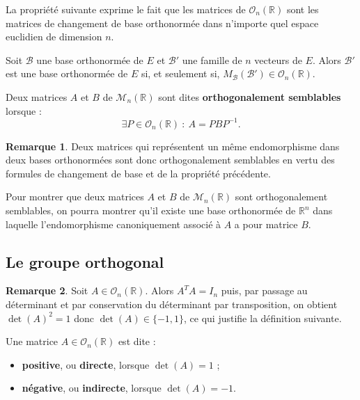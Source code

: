 \documentclass[french]{article}
\newcommand{\R}{\mathbb{R}}
\newcommand{\inv}{^{-1}}
\theoremstyle{plain}
\theoremstyle{definition}
\newtheorem*{rmq}{Remarque}
\theoremstyle{remark}
\begin{document}
La propriété suivante exprime le fait que les matrices de $\mathcal{O}_n(\R)$ sont les matrices de changement de base orthonormée dans n'importe quel espace euclidien de dimension $n$.

\begin{prop}
	Soit $\mathcal{B}$ une base orthonormée de $E$ et $\mathcal{B}'$ une famille de $n$ vecteurs de $E$. Alors $\mathcal{B}'$ est une base orthonormée de $E$ si, et seulement si, $M_\mathcal{B}(\mathcal{B}')\in\mathcal{O}_n(\R)$.
\end{prop}

\begin{dfn}
	Deux matrices $A$ et $B$ de $\mathcal{M}_n(\R)$ sont dites \textbf{orthogonalement semblables} lorsque : $$\exists P\in\mathcal{O}_n(\R)\ : \ A=PBP\inv.$$
\end{dfn}

\begin{rmq}
	Deux matrices qui représentent un même endomorphisme dans deux bases orthonormées sont donc orthogonalement semblables en vertu des formules de changement de base et de la propriété précédente.
\end{rmq}

\begin{met}
	Pour montrer que deux matrices $A$ et $B$ de $\mathcal{M}_n(\R)$ sont orthogonalement semblables, on pourra montrer qu'il existe une base orthonormée de $\R^n$ dans laquelle l'endomorphisme canoniquement associé à $A$ a pour matrice $B$.
\end{met}

\subsection{Le groupe orthogonal}

\begin{rmq}
	Soit $A\in\mathcal{O}_n(\R)$. Alors $A^TA=I_n$ puis, par passage au déterminant et par conservation du déterminant par transposition, on obtient $\det(A)^2=1$ donc $\det(A)\in\{-1,1\}$, ce qui justifie la définition suivante.
\end{rmq}

\begin{dfn}
	Une matrice $A\in\mathcal{O}_n(\R)$ est dite :
	\begin{itemize}
		\item \textbf{positive}, ou \textbf{directe}, lorsque $\det(A)=1$ ;
		\item \textbf{négative}, ou \textbf{indirecte}, lorsque $\det(A)=-1$.
	\end{itemize}
\end{dfn}
\end{document}
